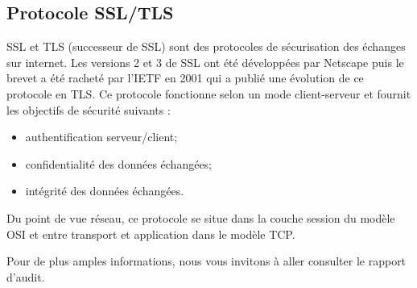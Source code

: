 \subsection{Protocole SSL/TLS}
SSL et TLS (successeur de SSL) sont des protocoles de sécurisation des échanges sur internet. Les versions 2 et 3 de SSL ont été développées par Netscape puis le brevet a été racheté par l’IETF en 2001 qui a publié une évolution de ce protocole en TLS. Ce protocole fonctionne selon un mode client-serveur et fournit les objectifs de sécurité suivants :
\begin{itemize}
	\item authentification serveur/client;
	\item confidentialité des données échangées;
	\item intégrité des données échangées.\\
\end{itemize}
Du point de vue réseau, ce protocole se situe dans la couche session du modèle OSI et entre transport et application dans le modèle TCP.

Pour de plus amples informations, nous vous invitons à aller consulter le rapport d'audit.



















